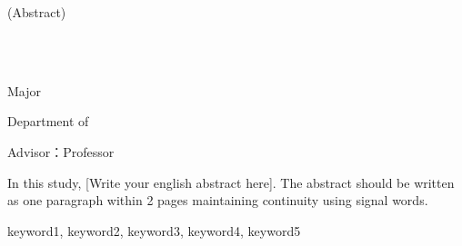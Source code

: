   {\hfill\fontsize{12}{12}\selectfont (Abstract)\par}
  \vspace{2mm}
  \begingroup
  \centering
    {\fontsize{20}{20}\selectfont \printthesistitleko \\ [1.5mm]}
    {\fontsize{15}{15}\selectfont \printthesistitlekosub \\}
  \endgroup
  \vspace{10mm}
    {\hfill\fontsize{14}{14}\selectfont \printauthornameEN \par}
    {\hfill\fontsize{14}{14}\selectfont \printmajorEN{} Major \par}
    {\hfill\fontsize{14}{14}\selectfont Department of \printdepartmentEN \par}
    {\hfill\fontsize{14}{14}\selectfont \printgradschoolEN \par}
    {\hfill\fontsize{14}{14}\selectfont Advisor：Professor \printadvisornameEN \par}
  \vspace{5mm}

  \begingroup
  \fontsize{12}{12}\selectfont
  In this study, [Write your english abstract here]. The abstract should be written as one paragraph within 2 pages maintaining continuity using signal words.
  \par
  \endgroup
  \vspace{4mm}
   {\fontsize{12}{12}\selectfont keyword1, keyword2, keyword3, keyword4, keyword5}